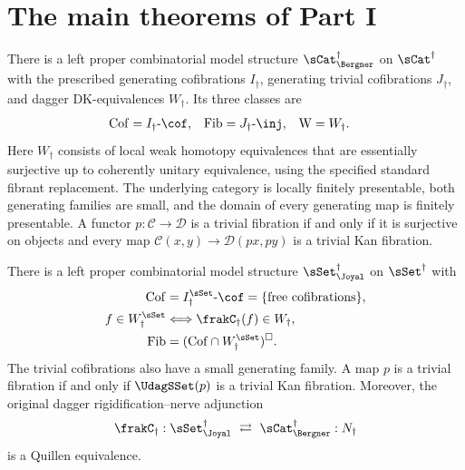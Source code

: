 \section{The main theorems of Part I}
\label{sec:main}

\begin{resultblock}
\begin{theorem}
There is a left proper combinatorial model structure $\sCat^{\dag}_{\Bergner}$ on $\sCat^{\dag}$ with the prescribed generating cofibrations $I_{\dag}$, generating trivial cofibrations $J_{\dag}$, and dagger DK-equivalences $W_{\dag}$.
Its three classes are
\begin{align}
\mathrm{Cof}&=I_{\dag}\text{-}\cof,&
\mathrm{Fib}&=J_{\dag}\text{-}\inj,&
\mathrm{W}&=W_{\dag}.
\end{align}
Here $W_{\dag}$ consists of local weak homotopy equivalences that are essentially surjective up to coherently unitary equivalence, using the specified standard fibrant replacement.
The underlying category is locally finitely presentable, both generating families are small, and the domain of every generating map is finitely presentable.
A functor $p:\mathcal C\to\mathcal D$ is a trivial fibration if and only if it is surjective on objects and every map
$\mathcal C(x,y)\to\mathcal D(px,py)$ is a trivial Kan fibration.
\end{theorem}
\end{resultblock}

\begin{resultblock}
\begin{theorem}
There is a left proper combinatorial model structure $\sSet^{\dag}_{\Joyal}$ on $\sSet^{\dag}$ with
\begin{align}
\mathrm{Cof}&=I^{\sSet}_{\dag}\text{-}\cof=\{\text{free cofibrations}\},\\
f\in W^{\sSet}_{\dag}&\Longleftrightarrow\frakC_{\dag}(f)\in W_{\dag},\\
\mathrm{Fib}&=(\mathrm{Cof}\cap W^{\sSet}_{\dag})^{\square}.
\end{align}
The trivial cofibrations also have a small generating family.
A map $p$ is a trivial fibration if and only if $\UdagSSet(p)$ is a trivial Kan fibration.
Moreover, the original dagger rigidification--nerve adjunction
\begin{align}
\frakC_{\dag}:\sSet^{\dag}_{\Joyal}
\ \rightleftarrows\ \sCat^{\dag}_{\Bergner}:N_{\dag}
\end{align}
is a Quillen equivalence.
\end{theorem}
\end{resultblock}

